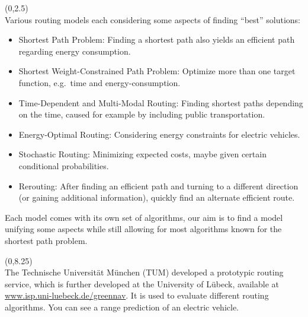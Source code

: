 \documentclass[a0,portrait]{a0poster}
\def\LHead#1{\noindent{\LARGE\color{oceangreen} #1}\smallskip}
\begin{document}
\begin{textblock}{5}(0,2.5)
\LHead{Introduction} \\
Various routing models each considering some aspects of finding ``best''
solutions:
\begin{itemize}
  \item Shortest Path Problem: Finding a shortest path also yields an efficient path regarding energy consumption.
  \item Shortest Weight-Constrained Path Problem: Optimize more than one target function, e.g.\ time and energy-consumption.
  \item Time-Dependent and Multi-Modal Routing: Finding shortest paths depending on the time, caused for example by including public transportation.
  \item Energy-Optimal Routing: Considering energy constraints for electric vehicles.
  \item Stochastic Routing: Minimizing expected costs, maybe given certain conditional probabilities.
  \item Rerouting: After finding an efficient path and turning to a different direction (or gaining additional information),
  quickly find an alternate efficient route.
\end{itemize}
Each model comes with its own set of algorithms,
our aim is to find a model unifying some aspects while still
allowing for most algorithms known for the shortest path problem.
\end{textblock}

\begin{textblock}{5}(0,8.25)
\LHead{Prototype} \\
The Technische Universit\"at M\"unchen (TUM) developed a prototypic routing service,
which is further developed at the University of L\"ubeck,
available at \url{www.isp.uni-luebeck.de/greennav}. It is used
to evaluate different routing algorithms. You can see a range prediction
of an electric vehicle.\\[1em]
\end{textblock}
\end{document}
